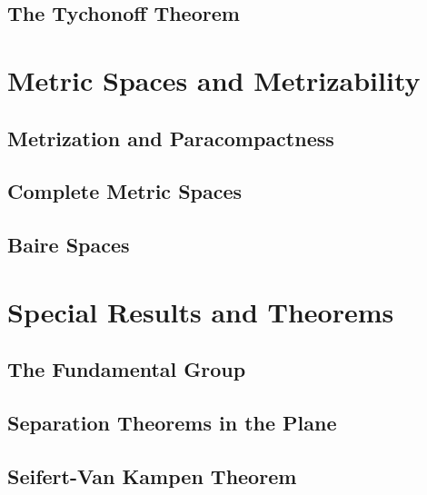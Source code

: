 \documentclass[12pt, a4paper, oneside, openright, titlepage]{book}
\begin{document}


\chapter{\textsection The Tychonoff Theorem}



\part{Metric Spaces and Metrizability}


\chapter{\textsection Metrization and Paracompactness}


\chapter{\textsection Complete Metric Spaces}


\chapter{\textsection Baire Spaces}


\part{Special Results and Theorems}


\chapter{\textsection The Fundamental Group}


\chapter{\textsection Separation Theorems in the Plane}


\chapter{\textsection Seifert-Van Kampen Theorem}
\end{document}
